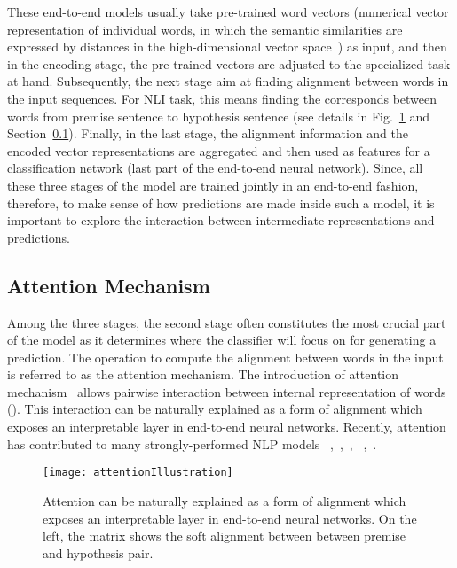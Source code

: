 These end-to-end models usually take pre-trained word vectors (numerical vector representation of individual words, in which the semantic similarities are expressed by distances in the high-dimensional vector space~\cite{MikolovSutskeverChen2013, PenningtonSocherManning2014}) as input, and then in the encoding stage, the pre-trained vectors are adjusted to the specialized task at hand. Subsequently, the next stage aim at finding alignment between words in the input sequences. For NLI task, this means finding the corresponds between words from premise sentence to hypothesis sentence (see details in Fig.~\ref{fig:attention} and Section~\ref{sec:attention}). Finally, in the last stage, the alignment information and the encoded vector representations are aggregated and then used as features for a classification network (last part of the end-to-end neural network).
%
Since, all these three stages of the model are trained jointly in an end-to-end fashion, therefore, to make sense of how predictions are made inside such a model, it is important to explore the interaction between intermediate representations and predictions.

\subsection{Attention Mechanism}
\label{sec:attention}
Among the three stages, the second stage often constitutes the most crucial part of the model as it determines where the classifier will focus on for generating a prediction. The operation to compute the alignment between words in the input is referred to as the attention mechanism. 
The introduction of attention mechanism~\cite{bahdanau2014neural} allows
pairwise interaction between internal representation of words (). 
This interaction can be naturally explained as a form of alignment which exposes an interpretable layer in end-to-end neural networks.
%
Recently, attention has contributed to many strongly-performed NLP models
~\cite{parikh2016emnlp},~\cite{rush2015neural},~\cite{yang2016hierarchical},
~\cite{seo2016bidirectional},~\cite{schwartz2017high}.

\begin{figure}[htbp]
\centering
\vspace{-2mm}
 \texttt{[image: attentionIllustration]}
 \caption{Attention can be naturally explained as a form of alignment which exposes an interpretable layer in end-to-end neural networks. On the left, the matrix shows the soft alignment between between premise and hypothesis pair.}
\label{fig:attention}
\end{figure}

